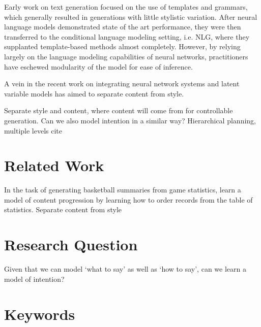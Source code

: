 \documentclass{article}
\begin{document}


Early work on text generation focused on the use of templates and grammars, 
which generally resulted in generations with little stylistic variation.
After neural language models demonstrated state of the art performance,
they were then transferred to the conditional language modeling setting,
i.e. NLG,
where they supplanted template-based methods almost completely.
However, by relying largely on the language modeling capabilities of neural networks,
practitioners have eschewed modularity of the model for ease of inference.



A vein in the recent work on integrating neural network systems and latent variable models
has aimed to separate content from style.

Separate style and content, where content will come from for controllable generation.
Can we also model intention in a similar way?
Hierarchical planning, multiple levels
cite 
\section{Related Work}
In the task of generating basketball summaries from game statistics,
\citet{puduppully2018contentselection} learn a model of content progression
by learning how to order records from the table of statistics.
\citep{puduppully2018contentselection,wiseman2018template}
Separate content from style
\section{Research Question}
Given that we can model `what to say' as well as `how to say',
can we learn a model of intention?
\section{Keywords}
\end{document}
